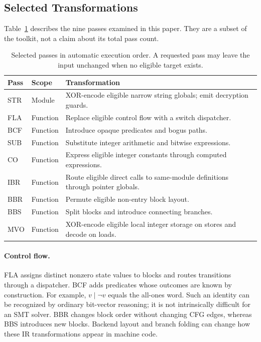 \documentclass[conference]{IEEEtran}
\begin{document}
\subsection{Selected Transformations}

Table~\ref{tab:passes} describes the nine passes examined in this paper.
They are a subset of the toolkit, not a claim about its total pass count.

\begin{table}[t]
\centering\footnotesize
\caption{Selected passes in automatic execution order. A requested pass
may leave the input unchanged when no eligible target exists.}
\label{tab:passes}
\begin{tabularx}{\columnwidth}{@{}llX@{}}
\toprule
Pass & Scope & Transformation \\
\midrule
STR & Module & XOR-encode eligible narrow string globals; emit decryption guards. \\
FLA & Function & Replace eligible control flow with a switch dispatcher. \\
BCF & Function & Introduce opaque predicates and bogus paths. \\
SUB & Function & Substitute integer arithmetic and bitwise expressions. \\
CO & Function & Express eligible integer constants through computed expressions. \\
IBR & Function & Route eligible direct calls to same-module definitions through pointer globals. \\
BBR & Function & Permute eligible non-entry block layout. \\
BBS & Function & Split blocks and introduce connecting branches. \\
MVO & Function & XOR-encode eligible local integer storage on stores and decode on loads. \\
\bottomrule
\end{tabularx}
\end{table}

\paragraph{Control flow.}
FLA assigns distinct nonzero state values to blocks and routes
transitions through a dispatcher. BCF adds predicates whose outcomes
are known by construction. For example, $v\mathbin{|}\neg v$ equals
the all-ones word. Such an identity can be recognized by ordinary
bit-vector reasoning; it is not intrinsically difficult for an SMT
solver. BBR changes block order without changing CFG edges, whereas
BBS introduces new blocks. Backend layout and branch folding can
change how these IR transformations appear in machine code.
\end{document}

